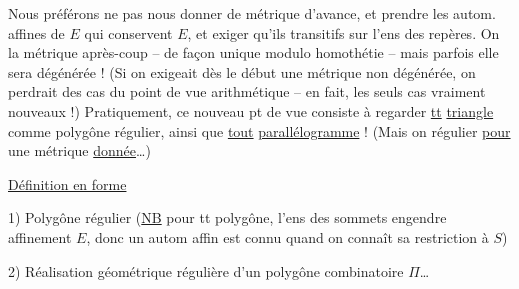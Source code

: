 Nous préférons ne pas nous donner de métrique
d'avance, et prendre les autom. affines de $E$
qui conservent $E$, et exiger qu'ils  transitifs
sur l'ens des repères. On  la métrique
après-coup -- de façon unique modulo homothétie
-- mais parfois elle sera dégénérée ! (Si on exigeait
dès le début une métrique non dégénérée, on perdrait
des cas   du point de
vue arithmétique -- en fait, les seuls cas vraiment
nouveaux !) Pratiquement, ce nouveau pt
de vue consiste à regarder \uline{tt} \uline{triangle} comme
polygône régulier, ainsi que \uline{tout} \uline{parallélogramme} !
(Mais on  régulier \uline{pour} une métrique
\uline{donnée}\ldots)

\uline{Définition en forme}

1) Polygône régulier (\uline{NB} pour tt polygône, l'ens des
sommets engendre affinement $E$, donc un autom
affin est connu quand on connaît sa restriction à $S$)

2) Réalisation géométrique régulière d'un polygône
combinatoire $\Pi$\ldots

